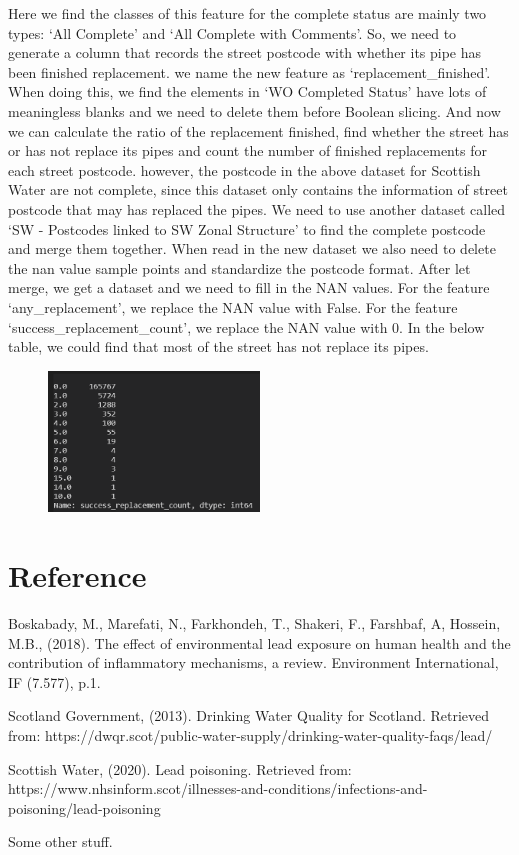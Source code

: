 \documentclass[11pt,twoside]{article}
\numberwithin{Theorem}{section}
\numberwithin{Definition}{section}
\numberwithin{Lemma}{section}
\numberwithin{Algorithm}{section}
\numberwithin{equation}{section}
\begin{document}
Here we find the classes of this feature for the complete status are mainly two types: ‘All Complete’ and ‘All Complete with Comments’. So, we need to generate a column that records the street postcode with whether its pipe has been finished replacement. we name the new feature as ‘replacement\_finished’. When doing this, we find the elements in ‘WO Completed Status’ have lots of meaningless blanks and we need to delete them before Boolean slicing. And now we can calculate the ratio of the replacement finished, find whether the street has or has not replace its pipes and count the number of finished replacements for each street postcode. however, the postcode in the above dataset for Scottish Water are not complete, since this dataset only contains the information of street postcode that may has replaced the pipes. We need to use another dataset called ‘SW - Postcodes linked to SW Zonal Structure’ to find the complete postcode and merge them together. When read in the new dataset we also need to delete the nan value sample points and standardize the postcode format. After let merge, we get a dataset and we need to fill in the NAN values. For the feature ‘any\_replacement’, we replace the NAN value with False. For the feature ‘success\_replacement\_count’, we replace the NAN value with 0. In the below table, we could find that most of the street has not replace its pipes.

\begin{figure}[!ht]
    \centering
    \includegraphics[width=0.5\textwidth]{p11.png}
    \end{figure}



\clearpage

\section{Reference}

\hspace{2em} Boskabady, M., Marefati, N., Farkhondeh, T., Shakeri, F., Farshbaf, A, Hossein, M.B., (2018). The effect of environmental lead exposure on human health and the contribution of inflammatory mechanisms, a review. Environment International, IF (7.577), p.1.

Scotland Government, (2013). Drinking Water Quality for Scotland. Retrieved from: https://dwqr.scot/public-water-supply/drinking-water-quality-faqs/lead/

Scottish Water, (2020). Lead poisoning. Retrieved from: https://www.nhsinform.scot/illnesses-and-conditions/infections-and-poisoning/lead-poisoning


Some other stuff.
\end{document}
